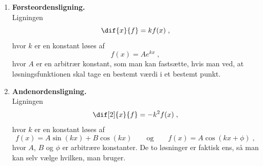 \begin{enumerate}[resume]
	\item\label{itm:d-lign1} \textbf{Førsteordensligning.}\\
	Ligningen
	\[
	\dif{x}{f} = k f(x) \; ,
	\]
	hvor $k$ er en konstant løses af
	\[
	f(x) = A e^{kx} \; ,
	\]
	hvor $A$ er en arbitrær konstant, som man kan fastsætte, hvis man
	ved, at løsningsfunktionen skal tage en bestemt værdi i et bestemt
	punkt.
	\item\label{itm:d-lign2} \textbf{Andenordensligning.}\\
	Ligningen
	\[
	\dif[2]{x}{f} = -k^2 f(x) \; ,
	\]
	hvor $k$ er en konstant løses af
	\[
	f(x) = A \sin (kx) + B \cos (kx)
	\qquad \text{og} \qquad
	f(x) = A \cos (kx + \phi) \; ,
	\]
	hvor $A$, $B$ og $\phi$ er arbitrære konstanter. De to løsninger er
	faktisk ens, så man kan selv vælge hvilken, man bruger.
\end{enumerate} 

